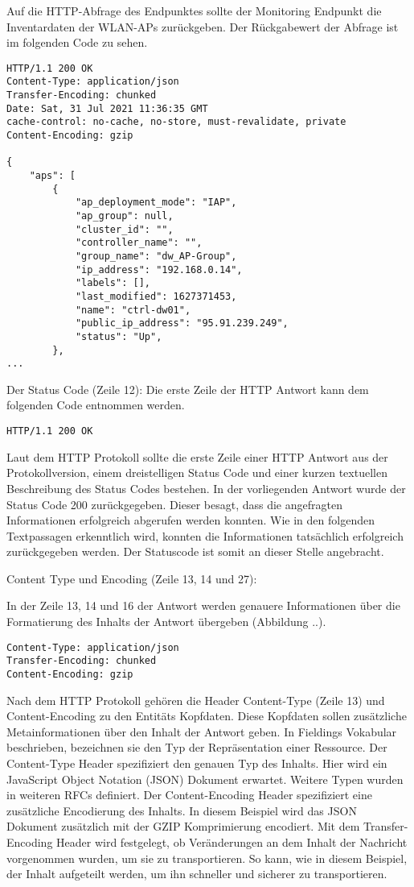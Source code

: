 Auf die HTTP-Abfrage des Endpunktes sollte der Monitoring Endpunkt die Inventardaten der WLAN-APs zurückgeben. Der Rückgabewert der Abfrage ist im folgenden Code zu sehen.


\lstset{firstnumber=12}
\begin{lstlisting}
HTTP/1.1 200 OK
Content-Type: application/json
Transfer-Encoding: chunked
Date: Sat, 31 Jul 2021 11:36:35 GMT
cache-control: no-cache, no-store, must-revalidate, private
Content-Encoding: gzip
 
{
	"aps": [
		{
			"ap_deployment_mode": "IAP",
			"ap_group": null,
			"cluster_id": "",
			"controller_name": "",
			"group_name": "dw_AP-Group",
			"ip_address": "192.168.0.14",
			"labels": [],
			"last_modified": 1627371453,
			"name": "ctrl-dw01",
			"public_ip_address": "95.91.239.249",
			"status": "Up",
		},
...    
\end{lstlisting}

Der Status Code (Zeile 12):
Die erste Zeile der HTTP Antwort kann dem folgenden Code entnommen werden.

\lstset{firstnumber=12}
\begin{lstlisting}
HTTP/1.1 200 OK
\end{lstlisting}

Laut dem HTTP Protokoll sollte die erste Zeile einer HTTP Antwort aus der Protokollversion, einem dreistelligen Status Code und einer kurzen textuellen Beschreibung des Status Codes bestehen. In der vorliegenden Antwort wurde der Status Code 200 zurückgegeben. Dieser besagt, dass die angefragten Informationen erfolgreich abgerufen werden konnten. Wie in den folgenden Textpassagen erkenntlich wird, konnten die Informationen tatsächlich erfolgreich zurückgegeben werden. Der Statuscode ist somit an dieser Stelle angebracht.

Content Type und Encoding (Zeile 13, 14 und 27): 

In der Zeile 13, 14 und 16 der Antwort werden genauere Informationen über die Formatierung des Inhalts der Antwort übergeben (Abbildung ..). 

\lstset{firstnumber=13}
\begin{lstlisting}
Content-Type: application/json
Transfer-Encoding: chunked
Content-Encoding: gzip
\end{lstlisting}

Nach dem HTTP Protokoll gehören die Header Content-Type (Zeile 13) und Content-Encoding zu den Entitäts Kopfdaten. Diese Kopfdaten sollen zusätzliche Metainformationen über den Inhalt der Antwort geben. In Fieldings Vokabular beschrieben, bezeichnen sie den Typ der Repräsentation einer Ressource. Der Content-Type Header spezifiziert den genauen Typ des Inhalts. Hier wird ein JavaScript Object Notation (JSON) Dokument erwartet. Weitere Typen wurden in weiteren RFCs definiert. Der Content-Encoding Header spezifiziert eine zusätzliche Encodierung des Inhalts. In diesem Beispiel wird das JSON Dokument zusätzlich mit der GZIP Komprimierung encodiert. Mit dem Transfer-Encoding Header wird festgelegt, ob Veränderungen an dem Inhalt der Nachricht vorgenommen wurden, um sie zu transportieren. So kann, wie in diesem Beispiel, der Inhalt aufgeteilt werden, um ihn schneller und sicherer zu transportieren.

